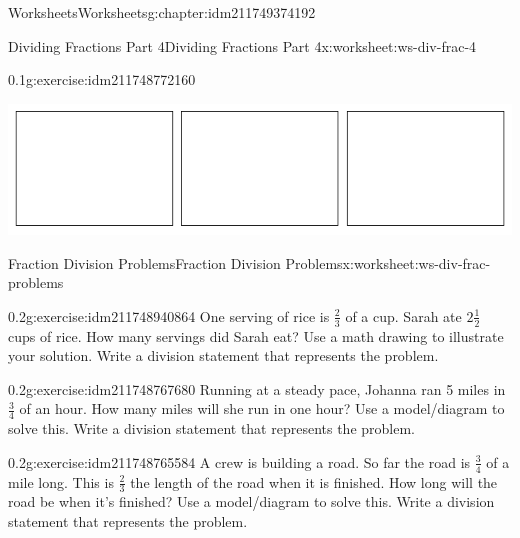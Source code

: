 \documentclass[twoside,11pt,]{book}
\begin{document}
\begin{chapterptx}{Worksheets}{}{Worksheets}{}{}{g:chapter:idm211749374192}
\begin{worksheet-section-numberless}{Dividing Fractions Part 4}{}{Dividing Fractions Part 4}{}{}{x:worksheet:ws-div-frac-4}
\begin{divisionexercise}{3}{}{0.1}{g:exercise:idm211748772160}
\begin{sidebyside}{1}{0.1}{0.1}{0}
\begin{sbspanel}{0.8}
\includegraphics[width=1\linewidth]{images/3-rectangles.png}
\end{sbspanel}%
\end{sidebyside}%
\end{divisionexercise}%
\end{worksheet-section-numberless}
\restoregeometry
%
%
\typeout{************************************************}
\typeout{************************************************}
%
\begin{worksheet-section-numberless}{Fraction Division Problems}{}{Fraction Division Problems}{}{}{x:worksheet:ws-div-frac-problems}
\begin{divisionexercise}{1}{}{0.2}{g:exercise:idm211748940864}%
One serving of rice is \(\frac{2}{3} \) of a cup.  Sarah ate \(2 \frac{1}{2} \) cups of rice.  How many servings did Sarah eat?  Use a math drawing to illustrate your solution.  Write a division statement that represents the problem.%
\end{divisionexercise}%
\begin{divisionexercise}{2}{}{0.2}{g:exercise:idm211748767680}%
Running at a steady pace, Johanna ran 5 miles in  \(\frac{3}{4} \)  of an hour.  How many miles will she run in one hour?  Use a model\slash{}diagram to solve this.  Write a division statement that represents the problem.%
\end{divisionexercise}%
\begin{divisionexercise}{3}{}{0.2}{g:exercise:idm211748765584}%
A crew is building a road.  So far the road is  \(\frac{3}{4} \) of a mile long.  This is  \(\frac{2}{3} \) the length of the road when it is finished.  How long will the road be when it’s finished? Use a model\slash{}diagram to solve this.  Write a division statement that represents the problem.%
\end{divisionexercise}%
\end{worksheet-section-numberless}
\restoregeometry
%
%
\typeout{************************************************}
\typeout{************************************************}

\end{chapterptx}
\end{document}
